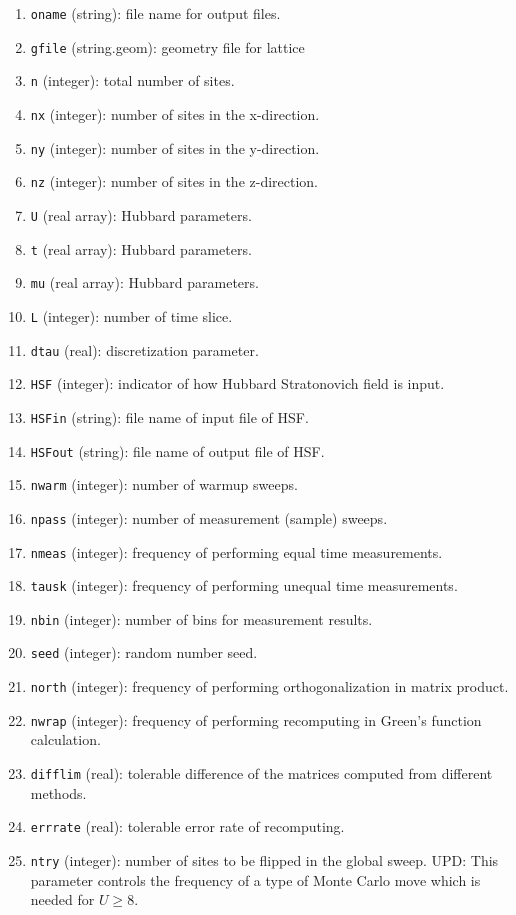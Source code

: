 \documentclass[12pt]{article}
\begin{document}
        \begin{enumerate}
            \item \verb"oname" (string): file name for output files.
            \item \verb"gfile" (string.geom): geometry file for lattice
            \item \verb"n" (integer): total number of sites.
            \item \verb"nx" (integer): number of sites in the x-direction.
            \item \verb"ny" (integer): number of sites in the y-direction.
            \item \verb"nz" (integer): number of sites in the z-direction.
            \item \verb"U" (real array): Hubbard parameters.
            \item \verb"t" (real array): Hubbard parameters.
            \item \verb"mu" (real array): Hubbard parameters.
            \item \verb"L" (integer): number of time slice.
            \item \verb"dtau" (real): discretization parameter.
            \item \verb"HSF" (integer): indicator of how Hubbard Stratonovich field is input.
            \item \verb"HSFin" (string): file name of input file of HSF.
            \item \verb"HSFout" (string): file name of output file of HSF.
            \item \verb"nwarm" (integer): number of warmup sweeps.
            \item \verb"npass" (integer): number of measurement (sample) sweeps.
            \item \verb"nmeas" (integer): frequency of performing equal time measurements.
            \item \verb"tausk" (integer): frequency of performing unequal time measurements.
            \item \verb"nbin" (integer): number of bins for measurement results.
            \item \verb"seed" (integer): random number seed.
            \item \verb"north" (integer): frequency of performing orthogonalization in matrix product.
            \item \verb"nwrap" (integer): frequency of performing recomputing in Green's function calculation.
            \item \verb"difflim" (real): tolerable difference of the matrices computed from different methods.
            \item \verb"errrate" (real): tolerable error rate of recomputing.
            \item \verb"ntry" (integer): number of sites to be flipped in the global sweep. UPD: This parameter controls the frequency of
            a type of Monte Carlo move which is needed for $U \geq 8$.
        \end{enumerate}
\end{document}
